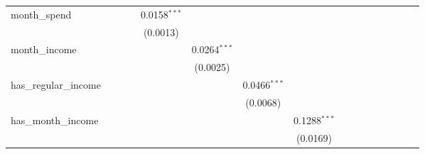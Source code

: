 \begin{table}[htbp]
\begin{tiny}
\begin{tabular}{lccccccccccccccc}
         month\_spend            &                 &                 &                 & 0.0158$^{***}$  &                 &                 &                 &                 &                 &                 &                 &                 &                 &                 &   \\
                                  &                 &                 &                 & (0.0013)        &                 &                 &                 &                 &                 &                 &                 &                 &                 &                 &   \\
         month\_income           &                 &                 &                 &                 & 0.0264$^{***}$  &                 &                 &                 &                 &                 &                 &                 &                 &                 &   \\
                                  &                 &                 &                 &                 & (0.0025)        &                 &                 &                 &                 &                 &                 &                 &                 &                 &   \\
         has\_regular\_income   &                 &                 &                 &                 &                 & 0.0466$^{***}$  &                 &                 &                 &                 &                 &                 &                 &                 &   \\
                                  &                 &                 &                 &                 &                 & (0.0068)        &                 &                 &                 &                 &                 &                 &                 &                 &   \\
         has\_month\_income     &                 &                 &                 &                 &                 &                 & 0.1288$^{***}$  &                 &                 &                 &                 &                 &                 &                 &   \\
                                  &                 &                 &                 &                 &                 &                 & (0.0169)        &                 &                 &                 &                 &                 &                 &                 &   \\

\end{tabular}
\end{tiny}
\end{table}
